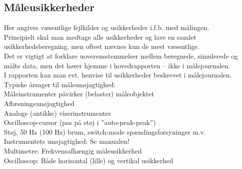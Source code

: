 \subsection*{Måleusikkerheder}
Her angives væsentlige fejlkilder og usikkerheder i.f.b. med målingen. \\
Principielt skal man medtage alle usikkerheder og lave en samlet usikkerhedsberegning, men oftest nævnes kun de mest væsentlige. \\
Det er vigtigt at forklare uoverensstemmelser mellem beregnede, simulerede og målte data, men det hører hjemme i hovedrapporten – ikke i målejournalen. \\
I rapporten kan man evt. henvise til usikkerheder beskrevet i målejournalen.\\
Typiske årsager til måleunøjagtighed:\\
Måleinstrumenter påvirker (belaster) måleobjektet\\
Aflæsningsunøjagtighed\\
Analoge (antikke) viserinstrumenter	\\
Oscilloscop-cursor (pas på støj i ”auto-peak-peak”)\\
Støj, 50 Hz (100 Hz) brum, switch-mode spændingsforsyninger m.v.\\
Instrumentets unøjagtighed: Se manualen! \\
Multimetre: Frekvensafhængig måleusikkerhed \\
Oscilloscop: Både horisontal (lille) og vertikal usikkerhed\\
%